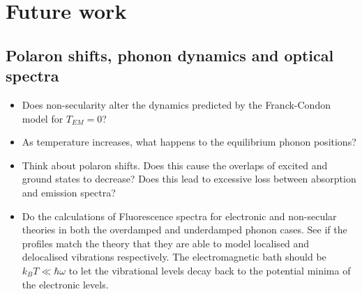 \documentclass[]{article}
\begin{document}
\begin{comment}
\subsection{Validity of RWA}
\begin{itemize}
	\item Comparing \ref{ssec:nrwa} and \ref{ssec:nsec} find regimes where the two different Hamiltonians yield the same dynamics. Within these regimes, do they agree with the secular theories too? Therefore, does secular imply rotating-wave (at least in the dissipators)?
	\item It seems like the underdamped spectral density reduces the temperature dependence of the dynamics. For strong phonon coupling, non-secular is never equivalent to the secular theory.
\end{itemize}
\end{comment}
\section{Future work}

\subsection{Polaron shifts, phonon dynamics and optical spectra}

\begin{itemize}
	\item Does non-secularity alter the dynamics predicted by the Franck-Condon model for $T_{EM}=0$?
	\item As temperature increases, what happens to the equilibrium phonon positions?
	\item Think about polaron shifts. Does this cause the overlaps of excited and ground states to decrease? Does this lead to excessive loss between absorption and emission spectra?
	\item Do the calculations of Fluorescence spectra for electronic and non-secular theories in both the overdamped and underdamped phonon cases. See if the profiles match the theory that they are able to model localised and delocalised vibrations respectively. The electromagnetic bath should be $k_B T\ll \hbar\omega$ to let the vibrational levels decay back to the potential minima of the electronic levels.
\end{itemize}




\end{document}
